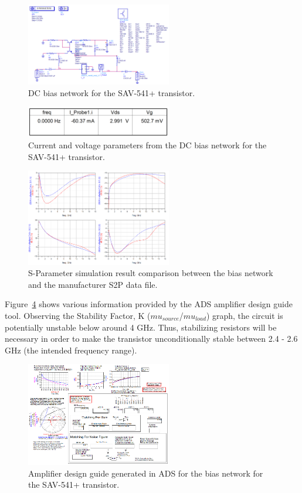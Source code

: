 \documentclass[conference]{IEEEtran}
\begin{document}
\begin{figure}[!h]
\centering
\includegraphics[width=2.5in]{pics/DCBiasNetwork.png}
\caption{DC bias network for the SAV-541+ transistor.}
\label{fig:dccircuit}
\end{figure}

\begin{figure}[!h]
\centering
\includegraphics[width=2.5in]{pics/DCBiasResults.png}
\caption{Current and voltage  parameters from the DC bias network for the SAV-541+ transistor.}
\label{fig:dcvalues}
\end{figure}

\begin{figure}[!h]
\centering
\includegraphics[width=2.5in]{pics/SParameterComparison.png}
\caption{S-Parameter simulation result comparison between the bias network and the manufacturer S2P data file.}
\label{fig:sparamresult}
\end{figure}

Figure~\ref{fig:designguide} shows various information provided by the ADS amplifier design guide tool.  Observing the Stability Factor, K ($mu_{source}$/$mu_{load}$) graph, the circuit is potentially unstable below around 4 GHz.  Thus, stabilizing resistors will be necessary in order to make the transistor unconditionally stable between 2.4 - 2.6 GHz (the intended frequency range).

\begin{figure}[!h]
\centering
\includegraphics[width=2.5in]{pics/DesignGuideUnoptimized.png}
\caption{Amplifier design guide generated in ADS for the bias network for the SAV-541+ transistor.}
\label{fig:designguide}
\end{figure}
\end{document}
